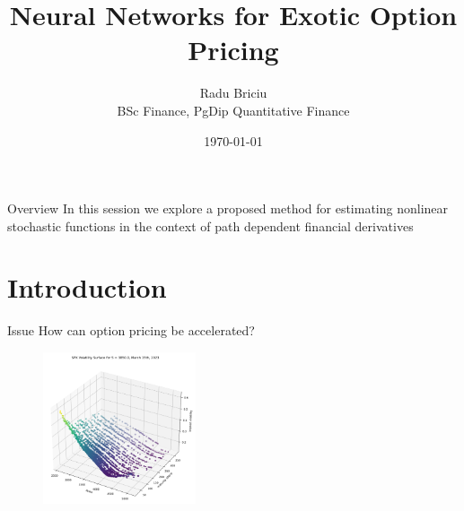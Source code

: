 \documentclass[aspectratio=169,xcolor=dvipsnames]{beamer}
\title{\huge \textbf{Neural Networks for Exotic Option Pricing}}
\author{\small Radu Briciu \\ \tiny BSc Finance, PgDip Quantitative Finance}
\institute
{
	
}
\date{\today} %
\begin{document}
		\begin{frame}
			\titlepage
		\end{frame}
		
		\begin{frame}{Overview}
			In this session we explore a proposed method for estimating nonlinear stochastic functions in the context of path dependent financial derivatives
			\tableofcontents
		\end{frame}
	
	\section{Introduction}
	
		\begin{frame}{Issue}
			How can option pricing be accelerated?
			\begin{figure}[h]
				\centering
				\includegraphics[width=0.4\textwidth]{../../images/surface.png}
			\end{figure}
		\end{frame}
		
%		
		
\end{document}
